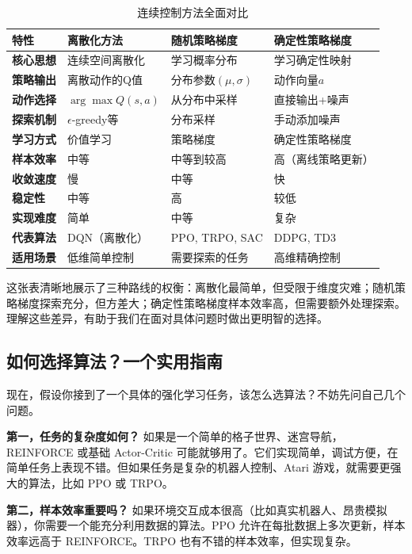 \documentclass[lang=cn,zihao=-4,a4paper,fontset=windows]{beautybook}
\begin{document}
\begin{table}[H]
\centering
\caption{连续控制方法全面对比}
\begin{tabular}{p{}p{}p{}p{}}
\toprule
\textbf{特性} & \textbf{离散化方法} & \textbf{随机策略梯度} & \textbf{确定性策略梯度} \\
\midrule
\textbf{核心思想} & 连续空间离散化 & 学习概率分布 & 学习确定性映射 \\
\textbf{策略输出} & 离散动作的Q值 & 分布参数$(\mu, \sigma)$ & 动作向量$a$ \\
\textbf{动作选择} & $\arg\max Q(s,a)$ & 从分布中采样 & 直接输出+噪声 \\
\textbf{探索机制} & $\epsilon$-greedy等 & 分布采样 & 手动添加噪声 \\
\textbf{学习方式} & 价值学习 & 策略梯度 & 确定性策略梯度 \\
\textbf{样本效率} & 中等 & 中等到较高 & 高（离线策略更新） \\
\textbf{收敛速度} & 慢 & 中等 & 快 \\
\textbf{稳定性} & 中等 & 高 & 较低 \\
\textbf{实现难度} & 简单 & 中等 & 复杂 \\
\textbf{代表算法} & DQN（离散化） & PPO, TRPO, SAC & DDPG, TD3 \\
\textbf{适用场景} & 低维简单控制 & 需要探索的任务 & 高维精确控制 \\
\bottomrule
\end{tabular}
\end{table}

这张表清晰地展示了三种路线的权衡：离散化最简单，但受限于维度灾难；随机策略梯度探索充分，但方差大；确定性策略梯度样本效率高，但需要额外处理探索。理解这些差异，有助于我们在面对具体问题时做出更明智的选择。

\subsection{如何选择算法？一个实用指南}

现在，假设你接到了一个具体的强化学习任务，该怎么选算法？不妨先问自己几个问题。

\textbf{第一，任务的复杂度如何？} 如果是一个简单的格子世界、迷宫导航，REINFORCE 或基础 Actor-Critic 可能就够用了。它们实现简单，调试方便，在简单任务上表现不错。但如果任务是复杂的机器人控制、Atari 游戏，就需要更强大的算法，比如 PPO 或 TRPO。

\textbf{第二，样本效率重要吗？} 如果环境交互成本很高（比如真实机器人、昂贵模拟器），你需要一个能充分利用数据的算法。PPO 允许在每批数据上多次更新，样本效率远高于 REINFORCE。TRPO 也有不错的样本效率，但实现复杂。
\end{document}
